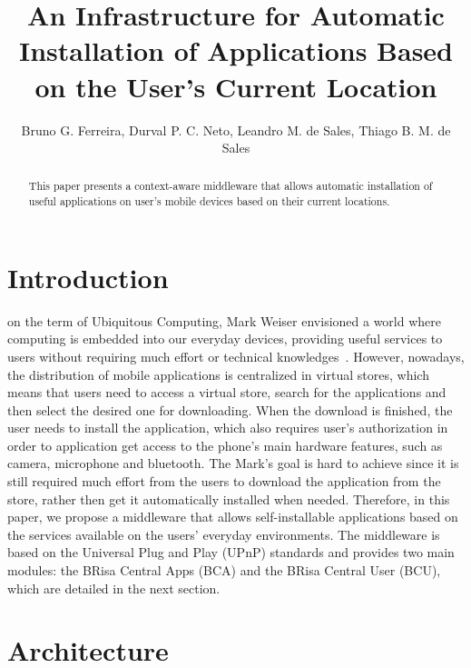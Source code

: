\documentclass[journal]{IEEEtran}
\begin{document}
  
\title{An Infrastructure for Automatic Installation of Applications Based on the User's Current Location}

\author{
        Bruno G. Ferreira,
        Durval P. C. Neto,
        Leandro M. de Sales,
        Thiago B. M. de Sales
}

\maketitle

\begin{abstract}
This paper presents a context-aware middleware that allows automatic installation of useful  applications on user's mobile devices based on their current locations.
\end{abstract}

\IEEEpeerreviewmaketitle

\section{Introduction}

 on the term of Ubiquitous Computing, Mark Weiser envisioned a world where computing is embedded into our everyday devices, providing useful services to  users without requiring much effort or technical knowledges~\cite{weiser1991computer}. However, nowadays, the distribution of mobile applications is centralized in virtual stores, which means that users need to access a virtual store, search for the applications and then select the desired one for downloading. When the download is finished, the user needs to install the application, which also requires user's authorization in order to application get access to the phone's main hardware features, such as camera, microphone and bluetooth. The Mark's goal is hard to achieve since it is still required much effort from the users to download the application from the store, rather then get it automatically installed when needed. Therefore, in this paper, we propose a middleware that allows self-installable applications based on the services available on the users' everyday environments. The middleware is based on the Universal Plug and Play (UPnP) standards and provides two main modules: the BRisa Central Apps (BCA) and the BRisa Central User (BCU), which are detailed in the next section.

\section{Architecture}
\end{document}
